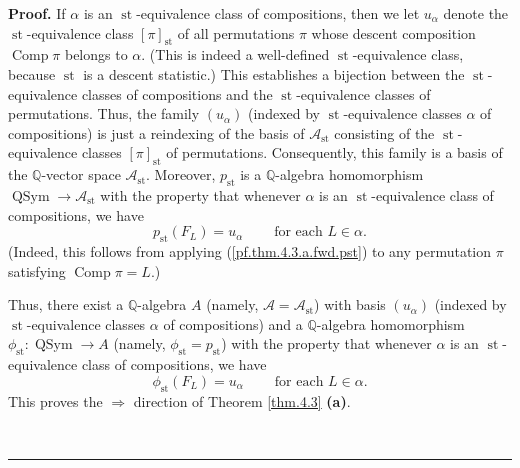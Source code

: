\documentclass[numbers=enddot,12pt,final,onecolumn,notitlepage]{scrartcl}%
\theoremstyle{definition}
\newenvironment{proof}[1][Proof]{\noindent\textbf{#1.} }{\ \rule{0.5em}{0.5em}}
\newenvironment{verlong}{}{}
\begin{document}
\begin{verlong}
\begin{proof}
If $\alpha$ is an $\operatorname{st}$-equivalence class of compositions, then
we let $u_{\alpha}$ denote the $\operatorname{st}$-equivalence class $\left[
\pi\right]  _{\operatorname{st}}$ of all permutations $\pi$ whose descent
composition $\operatorname*{Comp}\pi$ belongs to $\alpha$. (This is indeed a
well-defined $\operatorname{st}$-equivalence class, because
$\operatorname{st}$ is a descent statistic.) This establishes a bijection
between the $\operatorname{st}$-equivalence classes of compositions and the
$\operatorname{st}$-equivalence classes of permutations. Thus, the family
$\left(  u_{\alpha}\right)  $ (indexed by $\operatorname{st}$-equivalence
classes $\alpha$ of compositions) is just a reindexing of the basis of
$\mathcal{A}_{\operatorname{st}}$ consisting of the
$\operatorname{st}$-equivalence classes
$\left[  \pi\right]  _{\operatorname{st}}$ of
permutations. Consequently, this family is a basis of the $\mathbb{Q}$-vector
space $\mathcal{A}_{\operatorname{st}}$. Moreover, $p_{\operatorname{st}}$
is a $\mathbb{Q}$-algebra homomorphism $\operatorname*{QSym}\rightarrow
\mathcal{A}_{\operatorname{st}}$ with the property that whenever $\alpha$ is
an $\operatorname{st}$-equivalence class of compositions, we have%
\[
p_{\operatorname{st}}\left(  F_{L}\right)  =u_{\alpha}%
\ \ \ \ \ \ \ \ \ \ \text{for each }L\in\alpha.
\]
(Indeed, this follows from applying (\ref{pf.thm.4.3.a.fwd.pst}) to any
permutation $\pi$ satisfying $\operatorname*{Comp}\pi=L$.)

Thus, there exist a $\mathbb{Q}$-algebra $A$ (namely, $\mathcal{A}%
=\mathcal{A}_{\operatorname{st}}$) with basis $\left(  u_{\alpha}\right)  $
(indexed by $\operatorname{st}$-equivalence classes $\alpha$ of compositions)
and a $\mathbb{Q}$-algebra homomorphism $\phi_{\operatorname{st}}
:\operatorname*{QSym}\rightarrow A$ (namely, $\phi_{\operatorname{st}}
=p_{\operatorname{st}}$) with the property that whenever $\alpha$ is an
$\operatorname{st}$-equivalence class of compositions, we have%
\[
\phi_{\operatorname{st}}\left(  F_{L}\right)  =u_{\alpha}%
\ \ \ \ \ \ \ \ \ \ \text{for each }L\in\alpha.
\]
This proves the $\Longrightarrow$ direction of Theorem \ref{thm.4.3}
\textbf{(a)}.


\end{proof}
\end{verlong}
\end{document}
